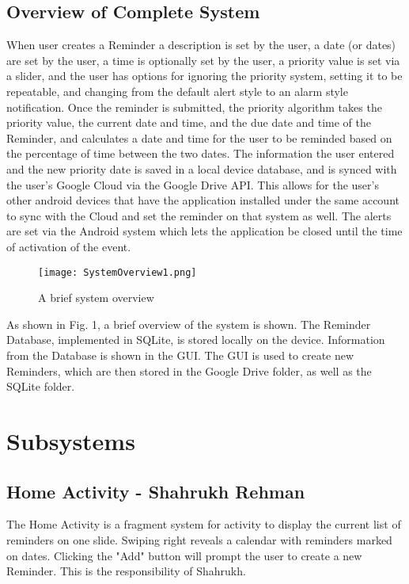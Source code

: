\documentclass[12pt]{article}
\begin{document}
\subsection{Overview of Complete System}
When user creates a Reminder a description is set by the user, a date (or dates)  are set by the user, a time is optionally set by the user, a priority value is set via a slider, and the user has options for ignoring the priority system, setting it to be repeatable, and changing from the default alert style to an alarm style notification. Once the reminder is submitted, the priority algorithm takes the priority value, the current date and time, and the due date and time of the Reminder, and calculates a date and time for the user to be reminded based on the percentage of time between the two dates. The information the user entered and the new priority date is saved in a local device database, and is synced with the user's Google Cloud via the Google Drive API. This allows for the user's other android devices that have the application installed under the same account to sync with the Cloud and set the reminder on that system as well. The alerts are set via the Android system which lets the application be closed until the time of activation of the event.

\begin{figure}[h]
\texttt{[image: SystemOverview1.png]}
\centering
\caption{A brief system overview}
\end{figure}

As shown in Fig. 1, a brief overview of the system is shown. The Reminder Database, implemented in SQLite, is stored locally on the device. Information from the Database is shown in the GUI. The GUI is used to create new Reminders, which are then stored in the Google Drive folder, as well as the SQLite folder.

\section{Subsystems}
\subsection{Home Activity - Shahrukh Rehman}
The Home Activity is a fragment system for activity to display the current list of reminders on one slide. Swiping right reveals a calendar with reminders marked on dates. Clicking the "Add" button will prompt the user to create a new Reminder. This is the responsibility of Shahrukh. 
\end{document}
